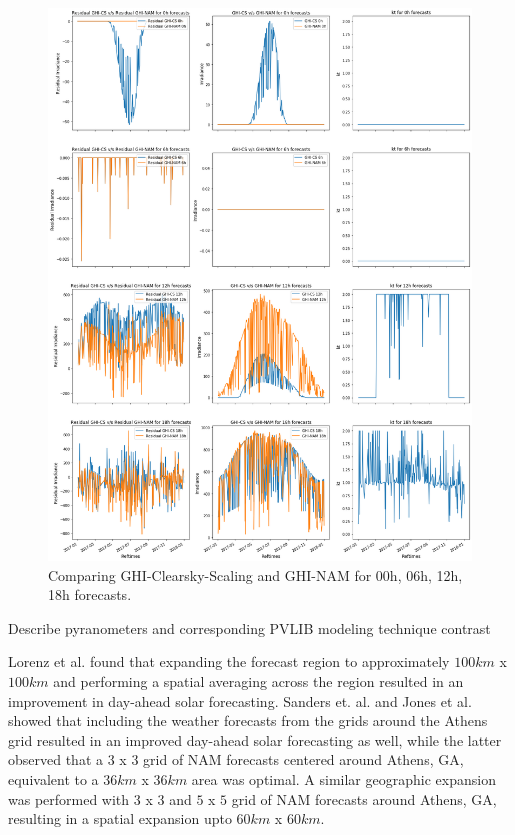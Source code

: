 

\begin{figure}[htbp]
    \begin{center}
    	\includegraphics[width=\textwidth]{chapter3/fig_ghi_comparison.png}
    	\caption[Comparing GHI-Clearsky-Scaling and GHI-NAM for 00h, 06h, 12h, 18h forecasts]{Comparing GHI-Clearsky-Scaling and GHI-NAM for 00h, 06h, 12h, 18h forecasts.}
    	\label{fig:fig_ghi_comparison}
    \end{center}
\end{figure}

\par Describe pyranometers and corresponding PVLIB modeling technique contrast


Lorenz et al. \cite{expansion_lorenz} found that expanding the forecast region to approximately $100 km$ x $100 km$ and performing a spatial averaging across the region resulted in an improvement in day-ahead solar forecasting. Sanders et. al. \cite{publication_sanders} and Jones et al. \cite{thesis_zach} showed that including the weather forecasts from the grids around the Athens grid resulted in an improved day-ahead solar forecasting as well, while the latter observed that a $3$ x $3$ grid of NAM forecasts centered around Athens, GA, equivalent to a $36km$ x $36km$ area was optimal. A similar geographic expansion was performed with $3$ x $3$ and $5$ x $5$ grid of NAM forecasts around Athens, GA, resulting in a spatial expansion upto $60km$ x $60km$.

